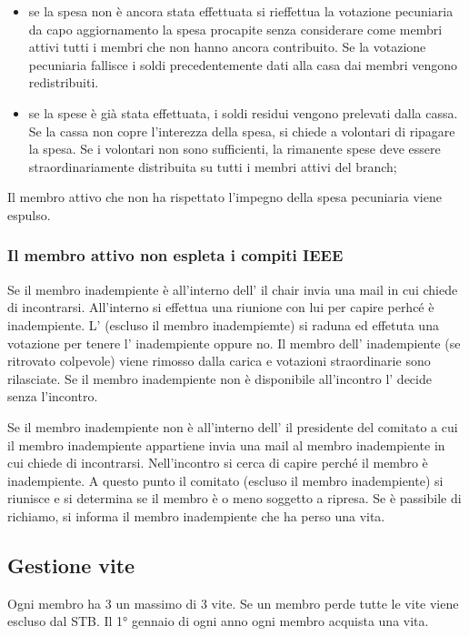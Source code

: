 \documentclass[pdf]{article}
\theoremstyle{definition}
\begin{document}
\begin{itemize}
	\item se la spesa non è ancora stata effettuata si rieffettua la votazione pecuniaria da capo aggiornamento la spesa procapite senza considerare come membri attivi tutti i membri che non hanno ancora contribuito. Se la votazione pecuniaria fallisce i soldi precedentemente dati alla casa dai membri vengono redistribuiti.
	\item se la spese è già stata effettuata, i soldi residui vengono prelevati dalla cassa. Se la cassa non copre l'interezza della spesa, si chiede a volontari di ripagare la spesa. Se i volontari non sono sufficienti, la rimanente spese deve essere straordinariamente distribuita su tutti i membri attivi del branch;
\end{itemize}

Il membro attivo che non ha rispettato l'impegno della spesa pecuniaria viene espulso.

\subsubsection{Il membro attivo non espleta i compiti IEEE}


Se il membro inadempiente è all'interno dell'\EC{} il chair invia una mail in cui chiede di incontrarsi. All'interno si effettua una riunione con lui per capire perhcé è inadempiente. L'\EC{} (escluso il membro inadempiemte) si raduna ed effetuta una votazione per tenere l'\EC{} inadempiente oppure no. Il membro dell'\EC{} inadempiente (se ritrovato colpevole) viene rimosso dalla carica e votazioni straordinarie sono rilasciate. Se il membro inadempiente non è disponibile all'incontro l'\EC{} decide senza l'incontro.


Se il membro inadempiente non è all'interno dell'\EC{} il presidente del comitato a cui il membro inadempiente appartiene invia una mail al membro inadempiente in cui chiede di incontrarsi. Nell'incontro si cerca di capire perché il membro è inadempiente. A questo punto il comitato (escluso il membro inadempiente) si riunisce e si determina se il membro è o meno soggetto a ripresa. Se è passibile di richiamo, si informa il membro inadempiente che ha perso una vita.


\subsection{Gestione vite}

Ogni membro ha 3 un massimo di 3 vite. Se un membro perde tutte le vite viene escluso dal STB. Il 1° gennaio di ogni anno ogni membro acquista una vita.
\end{document}
